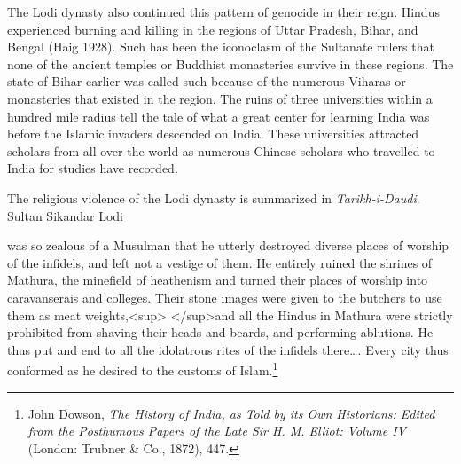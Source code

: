 The Lodi dynasty also continued this pattern of genocide in their reign. Hindus experienced burning and killing in the regions of Uttar Pradesh, Bihar, and Bengal (Haig 1928). Such has been the iconoclasm of the Sultanate rulers that none of the ancient temples or Buddhist monasteries survive in these regions. The state of Bihar earlier was called such because of the numerous Viharas or monasteries that existed in the region. The ruins of three universities within a hundred mile radius tell the tale of what a great center for learning India was before the Islamic invaders descended on India. These universities attracted scholars from all over the world as numerous Chinese scholars who travelled to India for studies have recorded. 

The religious violence of the Lodi dynasty is summarized in \textit{Tarikh-i-Daudi}. Sultan Sikandar Lodi

was so zealous of a Musulman that he utterly destroyed diverse places of worship of the infidels, and left not a vestige of them. He entirely ruined the shrines of Mathura, the minefield of heathenism and turned their places of worship into caravanserais and colleges. Their stone images were given to the butchers to use them as meat weights,<sup> </sup>and all the Hindus in Mathura were strictly prohibited from shaving their heads and beards, and performing ablutions. He thus put and end to all the idolatrous rites of the infidels there…. Every city thus conformed as he desired to the customs of Islam.\footnote{John Dowson, \textit{The History of India, as Told by its Own Historians: Edited from the Posthumous Papers of the Late Sir H. M. Elliot: Volume IV} (London: Trubner \& Co., 1872), 447.} 


